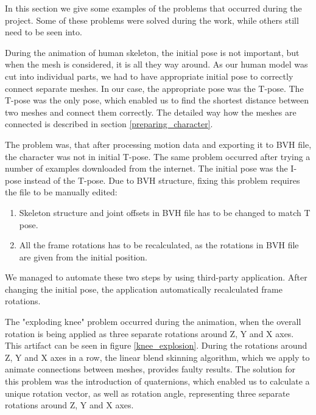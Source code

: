 \documentclass[times, 10pt,twocolumn]{article}
\begin{document}
\label{Problems}
In this section we give some examples of the problems that occurred during the project.
Some of these problems were solved during the work, while others still need to be seen into.


During the animation of human skeleton, the initial pose is not important, but when the mesh is considered,
it is all they way around. As our human model was cut into individual parts,
we had to have appropriate initial pose to correctly connect separate meshes. In our case, the appropriate pose was the T-pose. The T-pose was the only pose, which enabled us to find the shortest distance between two meshes and connect them correctly. The detailed way how the meshes are connected is described in section \ref{preparing_character}.

The problem was, that after processing motion data and exporting it to BVH file, the character was not in initial T-pose.
The same problem occurred after trying a number of examples downloaded from the internet. The initial pose was the I-pose instead of the T-pose.
Due to BVH structure, fixing this problem requires the file to be manually edited:

\begin{enumerate}
\item Skeleton structure and joint offsets in BVH file has to be changed to match T pose.
\item All the frame rotations has to be recalculated, as the rotations in BVH file are given from the initial position.
\end{enumerate}

We managed to automate these two steps by using third-party application. After changing the initial pose, the application automatically recalculated frame rotations.


The "exploding knee" problem occurred during the animation, when the overall rotation is being applied as three separate rotations around Z, Y and X axes. This artifact can be seen in figure \ref{knee_explosion}.
During the rotations around Z, Y and X axes in a row, the linear blend skinning algorithm, which we apply to animate connections between meshes, provides faulty results. The solution for this problem was the introduction of quaternions, which enabled us to calculate a unique rotation vector, as well as rotation angle, representing three separate rotations around Z, Y and X axes.
\end{document}
